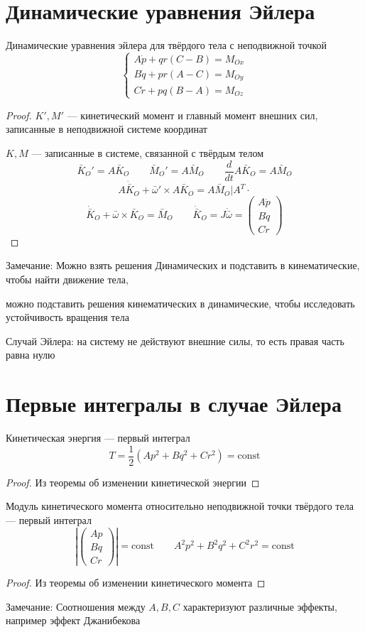 \documentclass[crop=false]{standalone}
\begin{document}
\section{Динамические уравнения Эйлера}

Динамические уравнения эйлера для твёрдого тела с неподвижной точкой
\[
\begin{cases}
    A \dot p + q r (C - B) = M_{O x} \\
    B \dot q + p r (A - C)= M_{O y} \\
    C \dot r + p q ( B - A) = M_{O z}
\end{cases}
\]
\begin{proof}

$K', M'$ — кинетический момент и главный момент внешних сил, записанные в неподвижной системе координат

$K, M$ — записанные в системе, связанной с твёрдым телом
\[\bar K_O' = A \bar K_O \qquad \bar M_O' = A \bar M_O \qquad \frac{d}{d t} A \bar K_O = A \bar M_O \]
\[A \dot {\bar K}_O + \bar \omega' \times A \bar K_O = A \bar M_O \big| A^T \cdot\]
\[\dot {\bar K}_O + \bar \omega \times \bar K_O = \bar M_O \qquad \dot {\bar K}_O =  J \dot{\bar \omega} = \begin{pmatrix}
    A \dot p \\ B \dot q \\ C \dot r
\end{pmatrix}\]
\end{proof}
Замечание: Можно взять решения Динамических и подставить в кинематические, чтобы найти движение тела, 

можно подставить решения кинематических в динамические, чтобы исследовать устойчивость вращения тела

Случай Эйлера: на систему не действуют внешние силы, то есть правая часть равна нулю

\section{Первые интегралы в случае Эйлера}
\noindent \keypoint Кинетическая энергия — первый интеграл
\[T = \frac{1}{2} \left(A p^2 + B q^2 + C r^2 \right)= \text{const}\]
\begin{proof}
    Из теоремы об изменении кинетической энергии
\end{proof}
\noindent \keypoint Модуль кинетического момента относительно неподвижной точки твёрдого тела — первый интеграл
\[\left| \begin{pmatrix}
    A p \\ B q \\ C r
\end{pmatrix}\right| = \text{const} \qquad A^2 p^2 + B^2 q^2 + C^2 r^2 = \text{const}\]
\begin{proof}
    Из теоремы об изменении кинетического момента
\end{proof}

Замечание: Соотношения между $A, B, C$ характеризуют различные эффекты, например эффект Джанибекова
\end{document}
